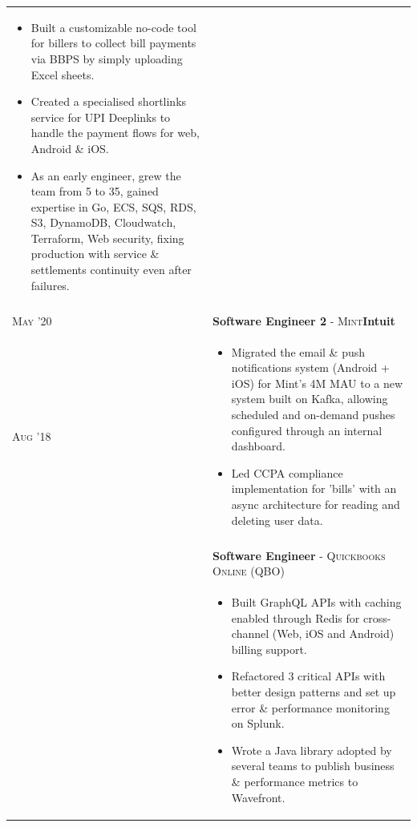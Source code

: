 \documentclass[a4paper,10pt]{extarticle} %
\begin{document}
\begin{tabularx}{\linewidth}{l | X}
\begin{itemize}[leftmargin=*, nosep, before=\vspace{-0.8\baselineskip}, after=\vspace{-1.0\baselineskip}]
  \item Built a customizable no-code tool for billers to collect bill payments via BBPS by simply uploading Excel sheets.
  \item Created a specialised shortlinks service for UPI Deeplinks to handle the payment flows for web, Android \& iOS.
  \item As an early engineer, grew the team from 5 to 35, gained expertise in Go, ECS, SQS, RDS, S3, DynamoDB, Cloudwatch, Terraform, Web security, fixing production with service \& settlements continuity even after failures.
\end{itemize}\\
\multicolumn{2}{c}{} \\

\textsc{May '20} & \textbf{Software Engineer 2} \textsc{- Mint}\hfill\raisebox{-.1\height}{ \hspace{0.3em}}\textbf{Intuit}\\
\textsc{Aug '18} & \begin{itemize}[leftmargin=*, nosep, before=\vspace{-0.8\baselineskip}, after=\vspace{-1.0\baselineskip}]
  \item Migrated the email \& push notifications system (Android + iOS) for Mint's 4M MAU to a new system built on Kafka, allowing scheduled and on-demand pushes configured through an internal dashboard.
  \item Led CCPA compliance implementation for 'bills' with an async architecture for reading and deleting user data.
\end{itemize}\\\\
& \textbf{Software Engineer} \textsc{- Quickbooks Online (QBO)}\\
& \begin{itemize}[leftmargin=*, nosep, before=\vspace{-0.8\baselineskip}, after=\vspace{-1.0\baselineskip}]
  \item Built GraphQL APIs with caching enabled through Redis for cross-channel (Web, iOS and Android) billing support.
  \item Refactored 3 critical APIs with better design patterns and set up error \& performance monitoring on Splunk.
  \item Wrote a Java library adopted by several teams to publish business \& performance metrics to Wavefront.

\end{itemize}
\end{tabularx}
\end{document}
